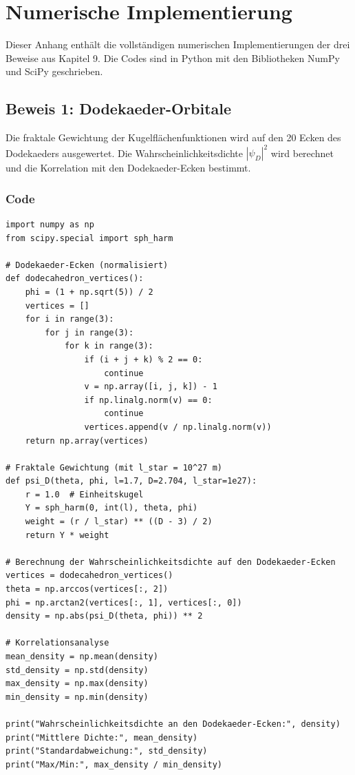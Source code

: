 \chapter{Numerische Implementierung}

Dieser Anhang enthält die vollständigen numerischen Implementierungen der drei Beweise aus Kapitel 9. Die Codes sind in Python mit den Bibliotheken NumPy und SciPy
geschrieben.

\section{Beweis 1: Dodekaeder-Orbitale}

Die fraktale Gewichtung der Kugelflächenfunktionen wird auf den 20 Ecken des Dodekaeders ausgewertet. Die Wahrscheinlichkeitsdichte \( |\psi_D|^2 \) wird berechnet
und die Korrelation mit den Dodekaeder-Ecken bestimmt.

\subsection{Code}

\begin{verbatim}
import numpy as np
from scipy.special import sph_harm

# Dodekaeder-Ecken (normalisiert)
def dodecahedron_vertices():
    phi = (1 + np.sqrt(5)) / 2
    vertices = []
    for i in range(3):
        for j in range(3):
            for k in range(3):
                if (i + j + k) % 2 == 0:
                    continue
                v = np.array([i, j, k]) - 1
                if np.linalg.norm(v) == 0:
                    continue
                vertices.append(v / np.linalg.norm(v))
    return np.array(vertices)

# Fraktale Gewichtung (mit l_star = 10^27 m)
def psi_D(theta, phi, l=1.7, D=2.704, l_star=1e27):
    r = 1.0  # Einheitskugel
    Y = sph_harm(0, int(l), theta, phi)
    weight = (r / l_star) ** ((D - 3) / 2)
    return Y * weight

# Berechnung der Wahrscheinlichkeitsdichte auf den Dodekaeder-Ecken
vertices = dodecahedron_vertices()
theta = np.arccos(vertices[:, 2])
phi = np.arctan2(vertices[:, 1], vertices[:, 0])
density = np.abs(psi_D(theta, phi)) ** 2

# Korrelationsanalyse
mean_density = np.mean(density)
std_density = np.std(density)
max_density = np.max(density)
min_density = np.min(density)

print("Wahrscheinlichkeitsdichte an den Dodekaeder-Ecken:", density)
print("Mittlere Dichte:", mean_density)
print("Standardabweichung:", std_density)
print("Max/Min:", max_density / min_density)
\end{verbatim}

